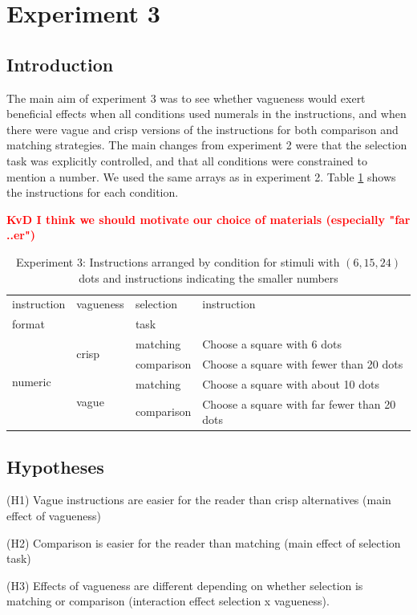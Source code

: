 \documentclass[%
man,		%
floatsintext,%
apacite%
]{apa6}
\begin{document}

\section{Experiment 3}

\subsection{Introduction}
The main aim of experiment 3 was to see whether vagueness would exert beneficial effects when all conditions used numerals in the instructions, and when there were vague and crisp versions of the instructions for both comparison and matching strategies. The main changes from experiment 2 were that the selection task was explicitly controlled, and that all conditions were constrained to mention a number. We used the same arrays as in experiment 2. Table \ref{Instructions for e3} shows the instructions for each condition. 

\textcolor{red}{{\bf KvD I think we should motivate our choice of materials (especially "far ..er")}}

\begin{table}[htbp]
\centering
\caption{Experiment 3: Instructions arranged by condition for stimuli with $(6,15,24)$ dots and instructions indicating the smaller numbers} 
\label{Instructions for e3}
\begin{tabular}{llll}
instruction				&vagueness			&	selection		&	instruction							\\
format				&					&	task			&									\\
\toprule
\multirow{4}{*}{numeric}	&\multirow{2}{*}{crisp} 	&	matching		& Choose a square with 6 dots 				\\ 
					&					&	comparison 	& Choose a square with fewer than 20 dots 	\\
					\cline{2-4}
					&\multirow{2}{*}{vague} 	&	matching 		& Choose a square with about 10 dots 		\\ 
 					&					&	comparison 	& Choose a square with far fewer than 20 dots 	\\ 
\bottomrule
\end{tabular}
\end{table}%

\subsection{Hypotheses} %
\begin{APAenumerate}
	\item [(H1)] Vague instructions are easier for the reader than crisp alternatives (main effect of vagueness)
	\item [(H2)] Comparison is easier for the reader than matching (main effect of selection task)
	\item [(H3)] Effects of vagueness are different depending on whether selection is matching or comparison (interaction effect selection x vagueness).
\end{APAenumerate}
\end{document}
